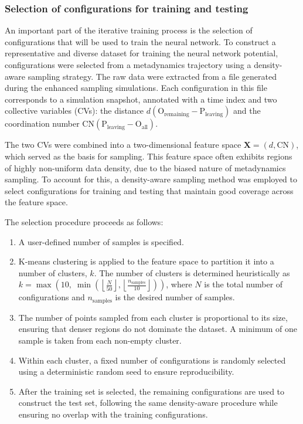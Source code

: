 \subsubsection{Selection of configurations for training and testing}

An important part of the iterative training process is the selection of configurations that will be used to train the neural network. To construct a representative and diverse dataset for training the neural network potential, configurations were selected from a metadynamics trajectory using a density-aware sampling strategy. The raw data were extracted from a file generated during the enhanced sampling simulations. Each configuration in this file corresponds to a simulation snapshot, annotated with a time index and two collective variables (CVs): the distance $d(\mathrm{O}_\text{remaining} - \mathrm{P}_\text{leaving})$ and the coordination number $\mathrm{CN}(\mathrm{P}_\text{leaving} - \mathrm{O}_\text{all})$.

The two CVs were combined into a two-dimensional feature space $\mathbf{X} = (d, \mathrm{CN})$, which served as the basis for sampling. This feature space often exhibits regions of highly non-uniform data density, due to the biased nature of metadynamics sampling. To account for this, a density-aware sampling method was employed to select configurations for training and testing that maintain good coverage across the feature space.

The selection procedure proceeds as follows:
\begin{enumerate}
    \item A user-defined number of samples is specified.
    \item K-means clustering is applied to the feature space to partition it into a number of clusters, $k$. The number of clusters is determined heuristically as $k = \max\left(10, \; \min\left(\left\lfloor \frac{N}{50} \right\rfloor, \left\lfloor \frac{n_\text{samples}}{10} \right\rfloor \right)\right)$, where $N$ is the total number of configurations and $n_\text{samples}$ is the desired number of samples.
    \item The number of points sampled from each cluster is proportional to its size, ensuring that denser regions do not dominate the dataset. A minimum of one sample is taken from each non-empty cluster.
    \item Within each cluster, a fixed number of configurations is randomly selected using a deterministic random seed to ensure reproducibility.
    \item After the training set is selected, the remaining configurations are used to construct the test set, following the same density-aware procedure while ensuring no overlap with the training configurations.
\end{enumerate}

